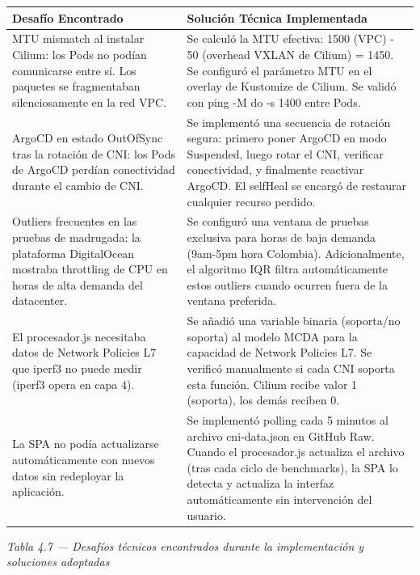 \documentclass[journal]{IEEEtran}
\begin{document}
\begin{table}[htbp]
\centering
\scriptsize
\begin{tabularx}{\textwidth}{|Y|Y|}
\hline
\textbf{Desafío Encontrado} & \textbf{Solución Técnica Implementada} \\
\hline
MTU mismatch al instalar Cilium: los Pods no podían comunicarse entre sí. Los paquetes se fragmentaban silenciosamente en la red VPC. & Se calculó la MTU efectiva: 1500 (VPC) - 50 (overhead VXLAN de Cilium) = 1450. Se configuró el parámetro MTU en el overlay de Kustomize de Cilium. Se validó con ping -M do -s 1400 entre Pods. \\
ArgoCD en estado OutOfSync tras la rotación de CNI: los Pods de ArgoCD perdían conectividad durante el cambio de CNI. & Se implementó una secuencia de rotación segura: primero poner ArgoCD en modo Suspended, luego rotar el CNI, verificar conectividad, y finalmente reactivar ArgoCD. El selfHeal se encargó de restaurar cualquier recurso perdido. \\
Outliers frecuentes en las pruebas de madrugada: la plataforma DigitalOcean mostraba throttling de CPU en horas de alta demanda del datacenter. & Se configuró una ventana de pruebas exclusiva para horas de baja demanda (9am-5pm hora Colombia). Adicionalmente, el algoritmo IQR filtra automáticamente estos outliers cuando ocurren fuera de la ventana preferida. \\
El procesador.js necesitaba datos de Network Policies L7 que iperf3 no puede medir (iperf3 opera en capa 4). & Se añadió una variable binaria (soporta/no soporta) al modelo MCDA para la capacidad de Network Policies L7. Se verificó manualmente si cada CNI soporta esta función. Cilium recibe valor 1 (soporta), los demás reciben 0. \\
La SPA no podía actualizarse automáticamente con nuevos datos sin redeployar la aplicación. & Se implementó polling cada 5 minutos al archivo cni-data.json en GitHub Raw. Cuando el procesador.js actualiza el archivo (tras cada ciclo de benchmarks), la SPA lo detecta y actualiza la interfaz automáticamente sin intervención del usuario. \\
\hline
\end{tabularx}
\end{table}

\begin{center}\emph{\emph{Tabla 4.7 --- Desafíos técnicos encontrados durante la implementación y soluciones adoptadas}}\end{center}
\end{document}
